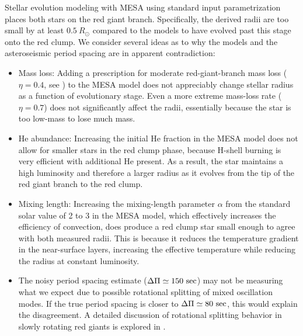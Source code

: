 Stellar evolution modeling with MESA using standard input parametrization places both stars on the red giant branch. Specifically, the derived radii are too small by at least $0.5 \ R_\odot$ compared to the models to have evolved past this stage onto the red clump. We consider several ideas as to why the models and the asteroseismic period spacing are in apparent contradiction:
\begin{itemize}
\item Mass loss: Adding a prescription for moderate red-giant-branch mass loss ($\eta = 0.4$, see \citet{mig12}) to the MESA model does not appreciably change stellar radius as a function of evolutionary stage. Even a more extreme mass-loss rate ($\eta = 0.7$) does not significantly affect the radii, essentially because the star is too low-mass to lose much mass.
\item He abundance: Increasing the initial He fraction in the MESA model does not allow for smaller stars in the red clump phase, because H-shell burning is very efficient with additional He present. As a result, the star maintains a high luminosity and therefore a larger radius as it evolves from the tip of the red giant branch to the red clump.
\item Mixing length: Increasing the mixing-length parameter $\alpha$ from the standard solar value of 2 to 3 in the MESA model, which effectively increases the efficiency of convection, does produce a red clump star small enough to agree with both measured radii. This is because it reduces the temperature gradient in the near-surface layers, increasing the effective temperature while reducing the radius at constant luminosity. 
\item The noisy period spacing estimate ($\Delta \Pi \simeq 150 \ \rm{sec}$) may not be measuring what we expect due to possible rotational splitting of mixed oscillation modes. If the true period spacing is closer to $\Delta \Pi \simeq 80 \ \rm{sec}$, this would explain the disagreement. A detailed discussion of rotational splitting behavior in slowly rotating red giants is explored in \citet{gou13}.
\end{itemize}

  
  
  